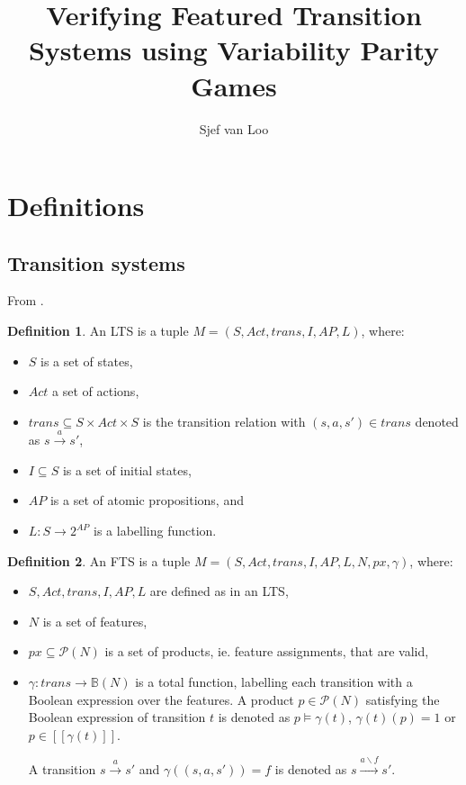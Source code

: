 \documentclass[]{article}
\title{Verifying Featured Transition Systems using Variability Parity Games}
\author{Sjef van Loo}
\theoremstyle{definition}
\newtheorem{definition}{Definition}[section]
\begin{document}
\maketitle

\section{Definitions}
\subsection{Transition systems}
From \cite{Classen2013FeaturedTS}.

\begin{definition}An LTS is a tuple $M = (S, Act, trans, I, AP, L)$, where:
	\begin{itemize}
		\item $S$ is a set of states,
		\item $Act$ a set of actions,
		\item $trans \subseteq S \times Act \times S$ is the transition relation with $(s,a,s') \in trans$ denoted as $s \xrightarrow a s'$,
		\item $I \subseteq S$ is a set of initial states,
		\item $AP$ is a set of atomic propositions, and
		\item $L : S \rightarrow 2^{AP}$ is a labelling function.
	\end{itemize}
\end{definition}

\begin{definition}An FTS is a tuple $M = (S, Act, trans, I, AP, L, N, px, \gamma)$, where:
	\begin{itemize}
		\item $S, Act, trans, I, AP, L$ are defined as in an LTS,
		\item $N$ is a set of features,
		\item $px \subseteq \mathcal{P}(N)$ is a set of products, ie. feature assignments, that are valid,
		\item $\gamma : trans \rightarrow \mathbb{B}(N)$ is a total function, labelling each transition with a Boolean expression over the features. A product $p \in \mathcal{P}(N)$ satisfying the Boolean expression of transition $t$ is denoted as $p \models \gamma(t)$, $\gamma(t)(p) = 1$ or $p \in [\![\gamma(t)]\!]$. 
		
		A transition $s \xrightarrow a s'$ and $\gamma((s,a,s')) = f$ is denoted as $s \xrightarrow {a \backslash f} s'$. 
	\end{itemize}
\end{definition}
\end{document}
